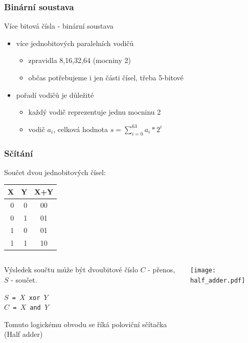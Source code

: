 \documentclass{beamer}
\begin{document}
\begin{frame}
\frametitle{Binární soustava}

Více bitová čísla - binární soustava
\begin{itemize}
\item více jednobitových paralelních vodičů
\begin{itemize}
\item zpravidla 8,16,32,64 (mocniny 2)
\item občas potřebujeme i jen části čísel, třeba 5-bitové
\end{itemize}
\item pořadí vodičů je důležité
\begin{itemize}
\item každý vodič reprezentuje jednu mocninu 2
\item vodič $a_{i}$, celková hodnota $s = \sum_{i=0}^{63} a_{i}*2^{i}$
\end{itemize}
\end{itemize}

\end{frame}


\begin{frame}
\frametitle{Sčítání}

Součet dvou jednobitových čísel:
\begin{tabular}{|r|r|c|}\hline
X & Y & X+Y\\ \hline
0 & 0 & 00\\ \hline
0 & 1 & 01\\ \hline
1 & 0 & 01\\ \hline
1 & 1 & 10\\ \hline
\end{tabular}

\bigskip

\begin{columns}
\begin{column}{0.55\textwidth}
Výsledek součtu může být dvoubitové číslo $C$ - přenos, $S$ - součet.
\bigskip

\texttt{$S$ = $X$ xor $Y$}\\
\texttt{$C$ = $X$ and $Y$}

\bigskip

Tomuto logickému obvodu se říká poloviční sčítačka (Half adder)
\end{column}
\begin{column}{0.45\textwidth}  
\begin{center}
   \texttt{[image: half\_adder.pdf]}
\end{center}
\end{column}
\end{columns}

\end{frame}
\end{document}
